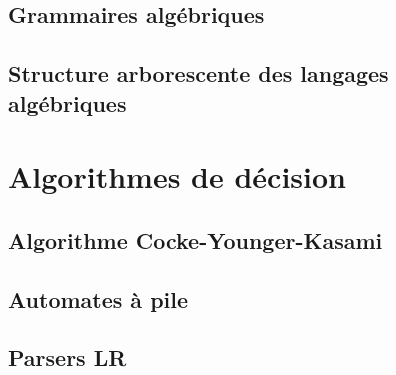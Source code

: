 \documentclass[9pt, handout]{beamer}
\begin{document}
\subsection{Grammaires algébriques}





 
\subsection{Structure arborescente des langages algébriques}






 
\section{Algorithmes de décision}
 
\subsection{Algorithme Cocke-Younger-Kasami}




 
\subsection{Automates à pile}











 
\subsection{Parsers LR}







 
\end{document}
